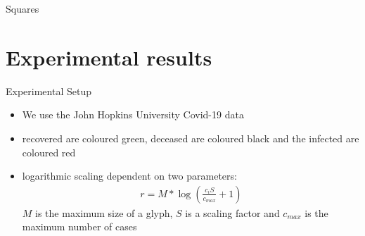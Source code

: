 \documentclass{beamer}
\begin{document}
\begin{frame}{Squares}
\end{frame}

\section{Experimental results}

\begin{frame}{Experimental Setup}
  \begin{itemize}
    \item We use the John Hopkins University Covid-19 data
    \item recovered are coloured green, deceased are coloured black and		the infected are coloured red
    \item logarithmic scaling dependent on two parameters:
      \begin{align*}
	r=M* \log \left( \frac{c_i S}{c_{max}} +1 \right)
      \end{align*}
      $M$ is the maximum size of a glyph, $S$ is a scaling factor and $c_{max}$ is			the maximum number of cases
  \end{itemize}
\end{frame}
\end{document}
